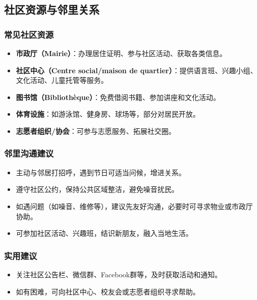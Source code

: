 \subsection{社区资源与邻里关系}

\subsubsection{常见社区资源}
\begin{itemize}
    \item \textbf{市政厅（Mairie）}：办理居住证明、参与社区活动、获取各类信息。
    \item \textbf{社区中心（Centre social/maison de quartier）}：提供语言班、兴趣小组、文化活动、儿童托管等服务。
    \item \textbf{图书馆（Bibliothèque）}：免费借阅书籍、参加讲座和文化活动。
    \item \textbf{体育设施}：如游泳馆、健身房、球场等，部分对居民开放。
    \item \textbf{志愿者组织/协会}：可参与志愿服务、拓展社交圈。
\end{itemize}

\subsubsection{邻里沟通建议}
\begin{itemize}
    \item 主动与邻居打招呼，遇到节日可适当问候，增进关系。
    \item 遵守社区公约，保持公共区域整洁，避免噪音扰民。
    \item 如遇问题（如噪音、维修等），建议先友好沟通，必要时可寻求物业或市政厅协助。
    \item 可参加社区活动、兴趣班，结识新朋友，融入当地生活。
\end{itemize}

\subsubsection{实用建议}
\begin{itemize}
    \item 关注社区公告栏、微信群、Facebook群等，及时获取活动和通知。
    \item 如有困难，可向社区中心、校友会或志愿者组织寻求帮助。
\end{itemize}

